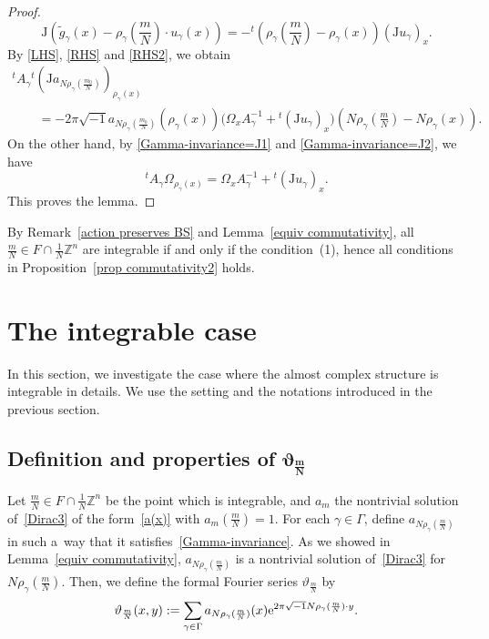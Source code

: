 \documentclass[pdftex]{sigma}
\numberwithin{equation}{section}
\newcommand{\Z}{\mathbb{Z}}
\renewcommand{\tilde}{\widetilde}
\def\J{\mathrm{J}}
\begin{document}
\begin{proof}
\begin{equation}
\J \left( {\tilde g}_\gamma(x)-\rho_\gamma\left(\frac{m}{N}\right)\cdot u_\gamma (x)\right)=-{}^t\left(\rho_\gamma \left(\frac{m}{N}\right)-\rho_\gamma (x)\right)\left(\J u_\gamma\right)_x.
\end{equation}
By \eqref{LHS}, \eqref{RHS} and \eqref{RHS2}, we obtain
\begin{gather*}
{}^tA_\gamma {}^t( \J a_{N\rho_\gamma (\frac{m_0}{N})})_{\rho_\gamma (x)}\\
\qquad=-2\pi\sqrt{-1}a_{N\rho_\gamma (\frac{m_0}{N})}(\rho_\gamma(x))\bigl(\Omega_xA_\gamma^{-1}+{}^t(\J u_\gamma)_x\bigr)\left(N\rho_\gamma \left(\frac{m}{N}\right)-N\rho_\gamma (x)\right) .
\end{gather*}
On the other hand, by \eqref{Gamma-invariance=J1} and \eqref{Gamma-invariance=J2}, we have
\begin{equation}\label{Gamma-relation of Omega}
{}^tA_\gamma \Omega_{\rho_\gamma (x)}=\Omega_xA_\gamma^{-1}+{}^t\left(\J u_\gamma\right)_x.
\end{equation}
This proves the lemma.
\end{proof}

\begin{Remark}\label{equiv commutativity2}
By Remark~\ref{action preserves BS} and Lemma~\ref{equiv commutativity}, all $\frac{m}{N}\in F\cap \frac{1}{N}\Z^n$ are integrable if and only if the condition~(1), hence all conditions in Proposition~\ref{prop commutativity2} holds.
\end{Remark}


\section{The integrable case}\label{the integrable case}
In this section, we investigate the case where the almost complex structure is integrable in details. We use the setting and the notations introduced in the previous section.

\subsection[Definition and properties of vartheta\_m/N]{Definition and properties of $\boldsymbol{\vartheta_{\frac{m}{N}}}$}
Let $\frac{m}{N}\in F\cap \frac{1}{N}\Z^n$ be the point which is integrable, and $a_m$ the nontrivial solution of~\eqref{Dirac3} of the form~\eqref{a(x)} with $a_m(\frac{m}{N})=1$. For each $\gamma \in \Gamma$, define $a_{N\rho_\gamma (\frac{m}{N})}$ in such a~way that it satisfies~\eqref{Gamma-invariance}. As we showed in Lemma~\ref{equiv commutativity}, $a_{N\rho_\gamma (\frac{m}{N})}$ is a nontrivial solution of~\eqref{Dirac3} for~$N\rho_\gamma (\frac{m}{N})$. Then, we define the formal Fourier series $\vartheta_{\frac{m}{N}}$ by
\begin{equation}\label{theta}
\vartheta_{\frac{m}{N}}(x,y):=\sum_{\gamma \in \Gamma}a_{N\rho_\gamma (\frac{m}{N})}(x){\rm e}^{2\pi\sqrt{-1}N\rho_\gamma (\frac{m}{N})\cdot y}.
\end{equation}
\end{document}
